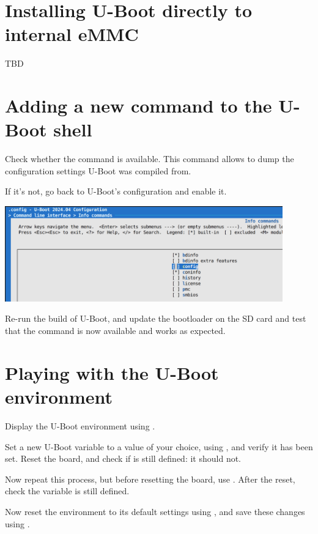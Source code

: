 \section{Installing U-Boot directly to internal eMMC}
TBD

\section{Adding a new command to the U-Boot shell}

Check whether the  command is available. This command
allows to dump the configuration settings U-Boot was compiled from.

If it's not, go back to U-Boot's configuration and enable it.

\begin{center}
\includegraphics[width=12cm]{labs/u-boot-installing-bbb/enable-config-cmd.png}
\end{center}

Re-run the build of U-Boot, and update the bootloader on the SD card
and test that the command is now available and works as expected.

\section{Playing with the U-Boot environment}

Display the U-Boot environment using .

Set a new U-Boot variable  to a value of your choice, using
, and verify it has been set. Reset the board, and check
if  is still defined: it should not.

Now repeat this process, but before resetting the board, use
. After the reset, check the  variable is
still defined.

Now reset the environment to its default settings using , and save these changes using .
